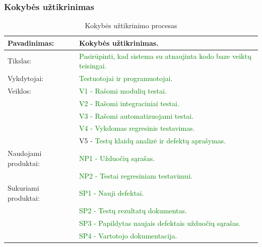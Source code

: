 \documentclass{VUMIFPSkursinis}
\begin{document}
	\subsubsection{Kokybės užtikrinimas}
	\begin{center}
		\begin{table}[ht]
			\caption{Kokybės užtikrinimo procesas}
			\begin{tabular}{ | l | l | }
				\hline
				Pavadinimas:		& Kokybės užtikrinimas.							\\ \hline
				Tikslas:		& \textcolor{green}{Pasirūpinti, kad sistema su atnaujinta kodo baze veiktų teisingai.}	\\ \hline
				Vykdytojai:		& \textcolor{green}{Testuotojai ir programuotojai.}					\\ \hline
				Veiklos:		& \textcolor{green}{V1 - Rašomi modulių testai.}						\\
							& \textcolor{green}{V2 - Rašomi integraciniai testai.}					\\
							& \textcolor{green}{V3 - Rašomi automatizuojami testai.}					\\
							& \textcolor{green}{V4 - Vykdomas regresinis testavimas.}					\\
							& V5 - \textcolor{green}{Testų klaidų analizė ir defektų aprašymas.}			\\ \hline
				Naudojami produktai:	& \textcolor{green}{NP1 - Užduočių sąrašas.} 						\\
							& \textcolor{green}{NP2 - Testai regresiniam testavimui.}					\\ \hline
				Sukuriami produktai:	& \textcolor{green}{SP1 - Nauji defektai.	}						\\
							&\textcolor{green}{ SP2 - Testų rezultatų dokumentas.	}				\\
							& \textcolor{green}{SP3 - Papildytas naujais defektais užduočių sąrašas.}			\\ 
							& \textcolor{green}{SP4 - Vartotojo dokumentacija.} \\ \hline
			\end{tabular}
		\end{table}
	\end{center}
\end{document}
